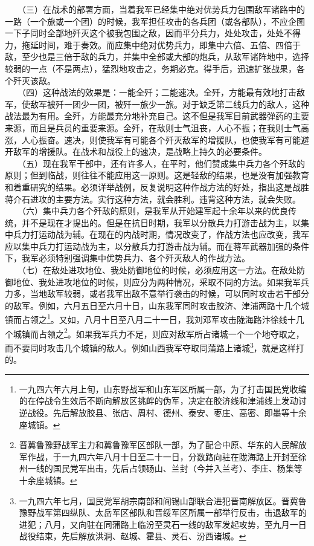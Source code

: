 \documentclass[cn,11pt,chinese]{elegantbook}
\begin{document}
　　（三）在战术的部署方面，当着我军已经集中绝对优势兵力包围敌军诸路中的一路（一个旅或一个团）的时候，我军担任攻击的各兵团（或各部队），不应企图一下子同时全部地歼灭这个被我包围之敌，因而平分兵力，处处攻击，处处不得力，拖延时间，难于奏效。而应集中绝对优势兵力，即集中六倍、五倍、四倍于敌，至少也是三倍于敌的兵力，并集中全部或大部的炮兵，从敌军诸阵地中，选择较弱的一点（不是两点），猛烈地攻击之，务期必克。得手后，迅速扩张战果，各个歼灭该敌。\\
　　（四）这种战法的效果是：一能全歼；二能速决。全歼，方能最有效地打击敌军，使敌军被歼一团少一团，被歼一旅少一旅。对于缺乏第二线兵力的敌人，这种战法最为有用。全歼，方能最充分地补充自己。这不但是我军目前武器弹药的主要来源，而且是兵员的重要来源。全歼，在敌则士气沮丧，人心不振；在我则士气高涨，人心振奋。速决，则使我军有可能各个歼灭敌军的增援队，也使我军有可能避开敌军的增援队。在战术和战役上的速决，是战略上持久的必要条件。\\
　　（五）现在我军干部中，还有许多人，在平时，他们赞成集中兵力各个歼敌的原则；但到临战，则往往不能应用这一原则。这是轻敌的结果，也是没有加强教育和着重研究的结果。必须详举战例，反复说明这种作战方法的好处，指出这是战胜蒋介石进攻的主要方法。实行这种方法，就会胜利。违背这种方法，就会失败。\\
　　（六）集中兵力各个歼敌的原则，是我军从开始建军起十余年以来的优良传统，并不是现在才提出的。但是在抗日时期，我军以分散兵力打游击战为主，以集中兵力打运动战为辅。在现在的内战时期，情况改变了，作战方法也应改变，我军应以集中兵力打运动战为主，以分散兵力打游击战为辅。而在蒋军武器加强的条件下，我军必须特别强调集中优势兵力、各个歼灭敌人的作战方法。\\
　　（七）在敌处进攻地位、我处防御地位的时候，必须应用这一方法。在敌处防御地位、我处进攻地位的时候，则应分为两种情况，采取不同的方法。如果我军兵力多，当地敌军较弱，或者我军出敌不意举行袭击的时候，可以同时攻击若干部分的敌军。例如，六月五日至六月十日，山东我军同时攻击胶济、津浦两路十几个城镇而占领之\footnote[5]{ 一九四六年六月上旬，山东野战军和山东军区所属一部，为了打击国民党收编的在停战令生效后不断向解放区挑衅的伪军，决定在胶济线和津浦线上发动讨逆战役。先后解放胶县、张店、周村、德州、泰安、枣庄、高密、即墨等十余座城镇。}。又如，八月十日至八月二十一日，我刘邓军攻击陇海路汴徐线十几个城镇而占领之\footnote[6]{ 晋冀鲁豫野战军主力和冀鲁豫军区部队一部，为了配合中原、华东的人民解放军作战，于一九四六年八月十日至二十一日，分数路向驻在陇海路上开封至徐州一线的国民党军出击，先后占领砀山、兰封（今并入兰考）、李庄、杨集等十余座城镇。}。如果我军兵力不足，则应对敌军所占诸城一个一个地夺取之，而不要同时攻击几个城镇的敌人。例如山西我军夺取同蒲路上诸城\footnote[7]{ 一九四六年七月，国民党军胡宗南部和阎锡山部联合进犯晋南解放区。晋冀鲁豫野战军第四纵队、太岳军区部队和晋绥军区所属一部举行反击，击退敌军的进犯；八月，又向驻在同蒲路上临汾至灵石一线的敌军发起攻势，至九月一日战役结束，先后解放洪洞、赵城、霍县、灵石、汾西诸城。}，就是这样打的。\\
\end{document}
